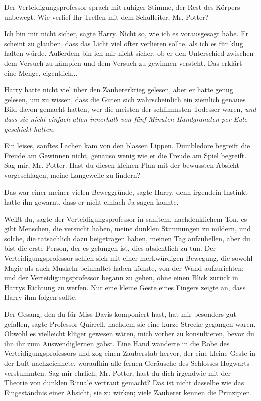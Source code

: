 Der Verteidigungsprofessor sprach mit ruhiger Stimme, der Rest des Körpers
unbewegt. \glqq Wie verlief Ihr Treffen mit dem Schulleiter, Mr. Potter?\grqq{}

\glqq Ich bin mir nicht sicher\grqq{}, sagte Harry. \glqq Nicht so, wie ich es
vorausgesagt habe. Er scheint zu glauben, dass das Licht viel öfter verlieren
sollte, als ich es für klug halten würde. Außerdem bin ich mir nicht sicher, ob
er den Unterschied zwischen dem Versuch zu kämpfen und dem Versuch zu gewinnen
versteht. Das erklärt eine Menge, eigentlich...\grqq{}

Harry hatte nicht viel über den Zaubererkrieg gelesen, aber er hatte genug
gelesen, um zu wissen, dass die Guten sich wahrscheinlich ein ziemlich genaues
Bild davon gemacht hatten, wer die meisten der schlimmsten Todesser waren,
\emph{und dass sie nicht einfach allen innerhalb von fünf Minuten Handgranaten
per Eule geschickt hatten.}

Ein leises, sanftes Lachen kam von den blassen Lippen. \glqq Dumbledore begreift
die Freude am Gewinnen nicht, genauso wenig wie er die Freude am Spiel begreift.
Sag mir, Mr. Potter. Hast du diesen kleinen Plan mit der bewussten Absicht
vorgeschlagen, meine Langeweile zu lindern?\grqq{}

\glqq Das war einer meiner vielen Beweggründe\grqq{}, sagte Harry, denn
irgendein Instinkt hatte ihn gewarnt, dass er nicht einfach Ja sagen konnte.

\glqq Weißt du\grqq{}, sagte der Verteidigungsprofessor in sanftem,
nachdenklichem Ton, \glqq es gibt Menschen, die versucht haben, meine dunklen
Stimmungen zu mildern, und solche, die tatsächlich dazu beigetragen haben,
meinen Tag aufzuhellen, aber du bist die erste Person, der es gelungen ist, dies
absichtlich zu tun.\grqq{} Der Verteidigungsprofessor schien sich mit einer
merkwürdigen Bewegung, die sowohl Magie als auch Muskeln beinhaltet haben
könnte, von der Wand aufzurichten; und der Verteidigungsprofessor begann zu
gehen, ohne einen Blick zurück in Harrys Richtung zu werfen. Nur eine kleine
Geste eines Fingers zeigte an, dass Harry ihm folgen sollte.

\glqq Der Gesang, den du für Miss Davis komponiert hast, hat mir besonders gut
gefallen\grqq{}, sagte Professor Quirrell, nachdem sie eine kurze Strecke
gegangen waren. \glqq Obwohl es vielleicht klüger gewesen wären, mich vorher zu
konsultieren, bevor du ihn ihr zum Auswendiglernen gabst.\grqq{} Eine Hand
wanderte in die Robe des Verteidigungsprofessors und zog einen Zauberstab
hervor, der eine kleine Geste in der Luft nachzeichnete, woraufhin alle fernen
Geräusche des Schlosses Hogwarts verstummten. \glqq Sag mir ehrlich, Mr. Potter,
hast du dich irgendwie mit der Theorie von dunklen Rituale vertraut gemacht? Das
ist nicht dasselbe wie das Eingeständnis einer Absicht, sie zu wirken; viele
Zauberer kennen die Prinzipien.\grqq{}

